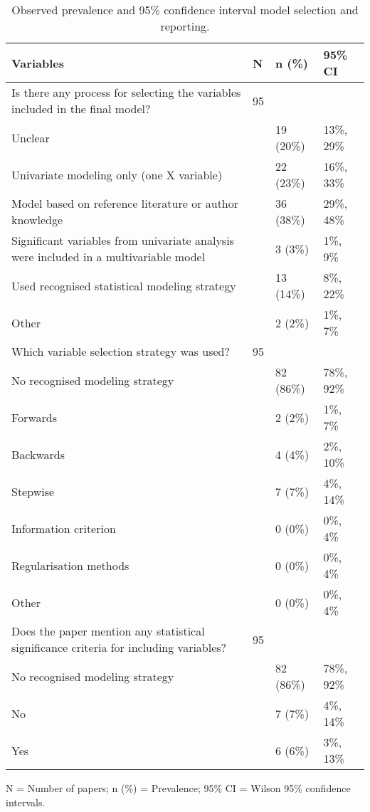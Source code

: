 \begin{table}[H]
\begin{widestuff}
\caption{Observed prevalence and 95\% confidence interval model selection and reporting.} 
\begin{flushleft}  \begin{tabular}{p{9cm}lll} 
  \toprule
{\bf Variables} & {\bf N} & {\bf n (\%) } & {\bf 95\% CI} \\ 
  \midrule
Is there any process for selecting the variables included in the final model? & 95 &  &  \\ 
  Unclear &  & 19 (20\%) & 13\%, 29\% \\ 
  Univariate modeling only (one X variable) &  & 22 (23\%) & 16\%, 33\% \\ 
  Model based on reference literature or author knowledge &  & 36 (38\%) & 29\%, 48\% \\ 
  Significant variables from univariate analysis were included in a multivariable model &  & 3 (3\%) &  1\%,  9\% \\ 
  Used recognised statistical modeling strategy &  & 13 (14\%) &  8\%, 22\% \\ 
  Other &  & 2 (2\%) &  1\%,  7\% \\ 
  Which variable selection strategy was used? & 95 &  &  \\ 
  No recognised modeling strategy &  & 82 (86\%) & 78\%, 92\% \\ 
  Forwards &  & 2 (2\%) &  1\%,  7\% \\ 
  Backwards &  & 4 (4\%) &  2\%, 10\% \\ 
  Stepwise &  & 7 (7\%) &  4\%, 14\% \\ 
  Information criterion &  & 0 (0\%) &  0\%,  4\% \\ 
  Regularisation methods &  & 0 (0\%) &  0\%,  4\% \\ 
  Other &  & 0 (0\%) &  0\%,  4\% \\ 
  Does the paper mention any statistical significance criteria for including variables? & 95 &  &  \\ 
  No recognised modeling strategy &  & 82 (86\%) & 78\%, 92\% \\ 
  No &  & 7 (7\%) &  4\%, 14\% \\ 
  Yes &  & 6 (6\%) &  3\%, 13\% \\ 
   \bottomrule
\end{tabular} \end{flushleft} \begin{flushleft} N = Number of papers; n (\%) = Prevalence;  95\% CI  =	Wilson 95\% confidence intervals. \end{flushleft}
\end{widestuff}
\end{table}

